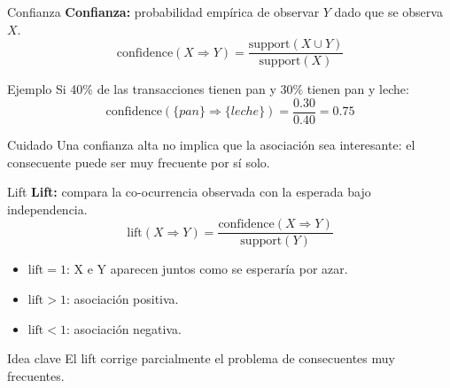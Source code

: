 \documentclass[10pt,aspectratio=169]{beamer}
\begin{document}
\begin{frame}{Confianza}
\textbf{Confianza:} probabilidad empírica de observar $Y$ dado que se observa $X$.
\[
\text{confidence}(X \Rightarrow Y) = \frac{\text{support}(X \cup Y)}{\text{support}(X)}
\]

\begin{exampleblock}{Ejemplo}
Si 40\% de las transacciones tienen pan y 30\% tienen pan y leche:
\[
\text{confidence}(\{pan\} \Rightarrow \{leche\}) = \frac{0.30}{0.40} = 0.75
\]
\end{exampleblock}

\begin{alertblock}{Cuidado}
Una confianza alta no implica que la asociación sea interesante: el consecuente puede ser muy frecuente por sí solo.
\end{alertblock}
\end{frame}

\begin{frame}{Lift}
\textbf{Lift:} compara la co-ocurrencia observada con la esperada bajo independencia.
\[
\text{lift}(X \Rightarrow Y)=\frac{\text{confidence}(X \Rightarrow Y)}{\text{support}(Y)}
\]

\begin{itemize}
  \item $\text{lift} = 1$: X e Y aparecen juntos como se esperaría por azar.
  \item $\text{lift} > 1$: asociación positiva.
  \item $\text{lift} < 1$: asociación negativa.
\end{itemize}

\begin{block}{Idea clave}
El lift corrige parcialmente el problema de consecuentes muy frecuentes.
\end{block}
\end{frame}
\end{document}
